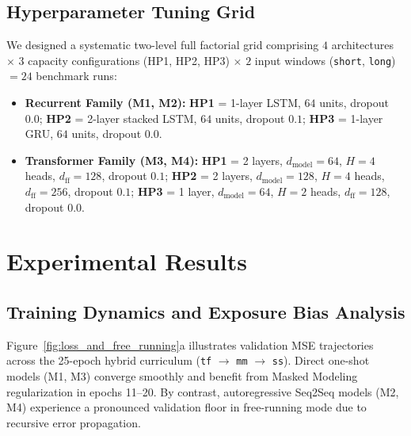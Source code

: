 \documentclass[10pt,a4paper]{article}
\begin{document}
\subsection{Hyperparameter Tuning Grid}
We designed a systematic two-level full factorial grid comprising $4$ architectures $\times$ $3$ capacity configurations (HP1, HP2, HP3) $\times$ $2$ input windows (\texttt{short}, \texttt{long}) $= 24$ benchmark runs:
\begin{itemize}[leftmargin=*, itemsep=1.5pt, topsep=2pt]
    \item \textbf{Recurrent Family (M1, M2):} \textbf{HP1} = 1-layer LSTM, $64$ units, dropout $0.0$; \textbf{HP2} = 2-layer stacked LSTM, $64$ units, dropout $0.1$; \textbf{HP3} = 1-layer GRU, $64$ units, dropout $0.0$.
    \item \textbf{Transformer Family (M3, M4):} \textbf{HP1} = 2 layers, $d_{\text{model}}=64$, $H=4$ heads, $d_{\text{ff}}=128$, dropout $0.1$; \textbf{HP2} = 2 layers, $d_{\text{model}}=128$, $H=4$ heads, $d_{\text{ff}}=256$, dropout $0.1$; \textbf{HP3} = 1 layer, $d_{\text{model}}=64$, $H=2$ heads, $d_{\text{ff}}=128$, dropout $0.0$.
\end{itemize}

\section{Experimental Results}

\subsection{Training Dynamics and Exposure Bias Analysis}
Figure~\ref{fig:loss_and_free_running}a illustrates validation MSE trajectories across the 25-epoch hybrid curriculum (\texttt{tf} $\to$ \texttt{mm} $\to$ \texttt{ss}). Direct one-shot models (M1, M3) converge smoothly and benefit from Masked Modeling regularization in epochs 11--20. By contrast, autoregressive Seq2Seq models (M2, M4) experience a pronounced validation floor in free-running mode due to recursive error propagation.
\end{document}
